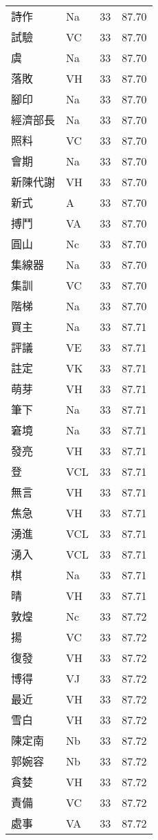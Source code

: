\documentclass[twocolumn]{book}
\begin{document}
\begin{supertabular}{llrr}
詩作 & Na & 33 &  87.70\\
試驗 & VC & 33 &  87.70\\
虞 & Na & 33 &  87.70\\
落敗 & VH & 33 &  87.70\\
腳印 & Na & 33 &  87.70\\
經濟部長 & Na & 33 &  87.70\\
照料 & VC & 33 &  87.70\\
會期 & Na & 33 &  87.70\\
新陳代謝 & VH & 33 &  87.70\\
新式 & A & 33 &  87.70\\
搏鬥 & VA & 33 &  87.70\\
圓山 & Nc & 33 &  87.70\\
集線器 & Na & 33 &  87.70\\
集訓 & VC & 33 &  87.70\\
階梯 & Na & 33 &  87.70\\
買主 & Na & 33 &  87.71\\
評議 & VE & 33 &  87.71\\
註定 & VK & 33 &  87.71\\
萌芽 & VH & 33 &  87.71\\
筆下 & Na & 33 &  87.71\\
窘境 & Na & 33 &  87.71\\
發亮 & VH & 33 &  87.71\\
登 & VCL & 33 &  87.71\\
無言 & VH & 33 &  87.71\\
焦急 & VH & 33 &  87.71\\
湧進 & VCL & 33 &  87.71\\
湧入 & VCL & 33 &  87.71\\
棋 & Na & 33 &  87.71\\
晴 & VH & 33 &  87.71\\
敦煌 & Nc & 33 &  87.72\\
揚 & VC & 33 &  87.72\\
復發 & VH & 33 &  87.72\\
博得 & VJ & 33 &  87.72\\
最近 & VH & 33 &  87.72\\
雪白 & VH & 33 &  87.72\\
陳定南 & Nb & 33 &  87.72\\
郭婉容 & Nb & 33 &  87.72\\
貪婪 & VH & 33 &  87.72\\
責備 & VC & 33 &  87.72\\
處事 & VA & 33 &  87.72\\

\end{supertabular}
\end{document}
